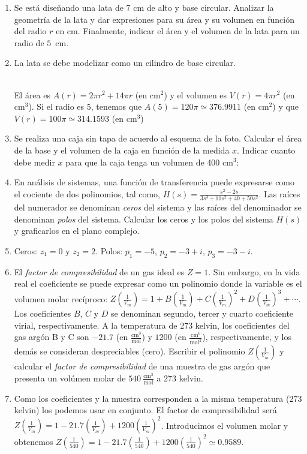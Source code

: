 \documentclass[a4paper]{article}
\newcommand{\answer}{\item[**]}
\newcommand{\df}[2]{\displaystyle\frac{#1}{#2}}
\newcommand{\img}[2]{ \begin{minipage}[t]{\linewidth} \raisebox{-\height}{\texttt{[image: \#2]}} \end{minipage} }
\begin{document}
\begin{enumerate}
\begin{enumerate} [label=(\alph*)]
		\item Se está diseñando una lata de 7 cm de alto y base circular. Analizar la geometría de la lata y dar expresiones para su área y su volumen en función del radio $r$ en cm. Finalmente, indicar el área y el volumen de la lata para un radio de $5$~cm.
		\answer La lata se debe modelizar como un cilindro de base circular. \\ \img{0.4\textwidth}{./img/lata.png} \\ El área es $A(r)=2 \pi r^2+ 14 \pi r$ (en cm$^2$) y el volumen es $V(r)=4 \pi r^2$ (en cm$^3$). Si el radio es $5$, tenemos que $A(5)=120\pi \simeq 376.9911$ (en cm$^2$) y que $V(r)=100\pi \simeq 314.1593$ (en cm$^3$)

		\item Se realiza una caja sin tapa de acuerdo al esquema de la foto. Calcular el área de la base y el volumen de la caja en función de la medida $x$. Indicar cuanto debe medir $x$ para que la caja tenga un volumen de 400 cm$^3$: \img{0.5\textwidth}{img/box.png} 

		\item En análisis de sistemas, una función de transferencia puede expresarse como el cociente de dos polinomios, tal como, $H(s)=\df{s^2-2s}{3s^3+11s^2+40+50s^2}$. Las raíces del numerador se denominan \textit{ceros} del sistema y las raíces del denominador se denominan \textit{polos} del sistema. Calcular los ceros y los polos del sistema $H(s)$ y graficarlos en el plano complejo.
		\answer Ceros: $z_1=0$ y $z_2=2$. Polos: $p_1=-5$, $p_2=-3+i$, $p_3=-3-i$.

		\item El \textit{factor de compresibilidad} de un gas ideal es $Z=1$. Sin embargo, en la vida real el coeficiente se puede expresar como un polinomio donde la variable es el volumen molar recíproco: $Z\left(\frac{1}{V_m}\right)=1+B\left(\frac{1}{V_m}\right)+C\left(\frac{1}{V_m}\right)^2+D\left(\frac{1}{V_m}\right)^3 + \cdots$. Los coeficientes $B$, $C$ y $D$ se denominan segundo, tercer y cuarto coeficiente virial, respectivamente. A la temperatura de 273 kelvin, los coeficientes del gas argón B y C son $-21.7$ (en $\frac{\text{cm}^3}{\text{mol}}$) y $1200$ (en $\frac{\text{cm}^6}{\text{mol}^2}$), respectivamente, y los demás se consideran despreciables (cero). Escribir el polinomio $Z\left(\frac{1}{V_m}\right)$ y calcular el \textit{factor de compresibilidad} de una muestra de gas argón que presenta un volúmen molar de $540~\frac{\text{cm}^3}{\text{mol}}$ a 273 kelvin.
		\answer Como los coeficientes y la muestra corresponden a la misma temperatura (273 kelvin) los podemos usar en conjunto. El factor de compresibilidad será $Z\left(\frac{1}{V_m}\right)=1-21.7\left(\frac{1}{V_m}\right)+1200\left(\frac{1}{V_m}\right)^2$. Introducimos el volumen molar y obtenemos $Z\left(\frac{1}{540}\right)=1-21.7\left(\frac{1}{540}\right)+1200\left(\frac{1}{540}\right)^2 \simeq 0.9589$.


\end{enumerate}
\end{enumerate}
\end{document}
